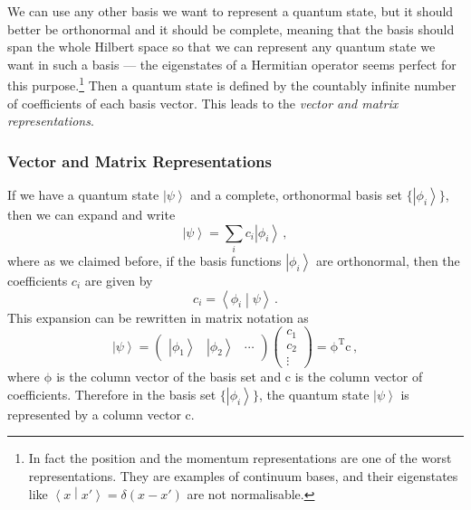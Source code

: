 \documentclass{article}
\theoremstyle{plain}\theoremheaderfont{\normalfont\itshape}\theorembodyfont{\rmfamily}\theoremseparator{.}\newtheorem*{rem}{Remark}\newtheorem*{ex}{Example}\newtheorem*{proof}{Proof}\newtheorem*{altp}{Alternative proof}
\theoremstyle{plain}\theoremheaderfont{\normalfont\bfseries}\theorembodyfont{\rmfamily}\theoremseparator{.}\newtheorem{thm}{Theorem}[section]\newtheorem{lem}[thm]{Lemma}\newtheorem{prop}[thm]{Proposition}\newtheorem*{cor}{Corollary}\newtheorem{defn}[thm]{Definition}\newtheorem{clm}[thm]{Claim}\newtheorem{clminproof}{Claim}
\theoremstyle{break}\theoremheaderfont{\normalfont\itshape}\theorembodyfont{\rmfamily}\theoremseparator{.\medskip}\newtheorem*{proofskip}{Proof}\newtheorem*{exs}{Examples}\newtheorem*{rems}{Remarks}
\theoremstyle{break}\theoremheaderfont{\normalfont\bfseries}\theorembodyfont{\rmfamily}\theoremseparator{.\medskip}\newtheorem{lemskip}[thm]{Lemma}\newtheorem{defnskip}[thm]{Definition}\newtheorem{propskip}[thm]{Proposition}\newtheorem{thmskip}[thm]{Theorem}
\numberwithin{equation}{section}
\newcommand{\tp}{^\mathrm{T}}
\newcommand{\ket}[1]{\left| #1 \right\rangle}
\newcommand{\braket}[2]{\left\langle #1 \middle| #2 \right\rangle}
\newcommand{\vb}[1]{\bm{\mathrm{#1}}}
\begin{document}
    We can use any other basis we want to represent a quantum state, but it should better be orthonormal and it should be complete, meaning that the basis should span the whole Hilbert space so that we can represent any quantum state we want in such a basis --- the eigenstates of a Hermitian operator seems perfect for this purpose.\footnote{In fact the position and the momentum representations are one of the worst representations. They are examples of continuum bases, and their eigenstates like \(\braket{x}{x'}=\delta(x-x')\) are not normalisable.} Then a quantum state is defined by the countably infinite number of coefficients of each basis vector. This leads to the \textit{vector and matrix representations}.

    \subsubsection{Vector and Matrix Representations}\label{Chap:Vec_and_Mat_reps}
    If we have a quantum state \(\ket{\psi}\) and a complete, orthonormal basis set \(\{\ket{\phi_i}\}\), then we can expand and write
    \begin{equation}
        \ket{\psi}=\sum_i c_i\ket{\phi_i}\,,
    \end{equation}
    where as we claimed before, if the basis functions \(\ket{\phi_i}\) are orthonormal, then the coefficients \(c_i\) are given by
    \begin{equation}
        c_i=\braket{\phi_i}{\psi}\,.
    \end{equation}
    This expansion can be rewritten in matrix notation as
    \begin{equation}
        \ket{\psi}=\begin{pmatrix}
            \ket{\phi_1} & \ket{\phi_2} & \cdots
        \end{pmatrix}\begin{pmatrix}
            c_1 \\ c_2 \\ \vdots
        \end{pmatrix}=\vb{\phi}\tp\vb{c}\,,
    \end{equation}
    where \(\vb{\phi}\) is the column vector of the basis set and \(\vb{c}\) is the column vector of coefficients. Therefore in the basis set \(\{\ket{\phi_i}\}\), the quantum state \(\ket{\psi}\) is represented by a column vector \(\vb{c}\).
\end{document}
